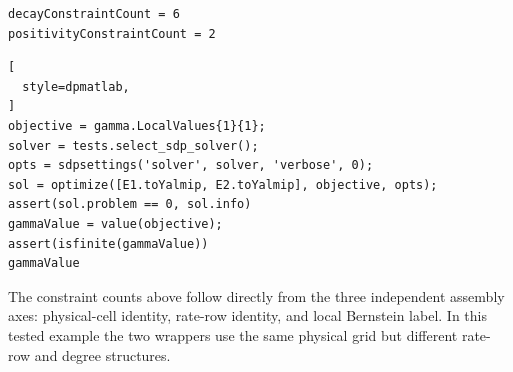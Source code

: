 \begin{lstlisting}[style=dpoutput]
decayConstraintCount = 6
positivityConstraintCount = 2
\end{lstlisting}

\begin{lstlisting}[
  style=dpmatlab,
]
objective = gamma.LocalValues{1}{1};
solver = tests.select_sdp_solver();
opts = sdpsettings('solver', solver, 'verbose', 0);
sol = optimize([E1.toYalmip, E2.toYalmip], objective, opts);
assert(sol.problem == 0, sol.info)
gammaValue = value(objective);
assert(isfinite(gammaValue))
gammaValue
\end{lstlisting}

The constraint counts above follow directly from the three independent assembly axes: physical-cell identity, rate-row identity, and local Bernstein label.  In this tested example the two wrappers use the same physical grid but different rate-row and degree structures.

